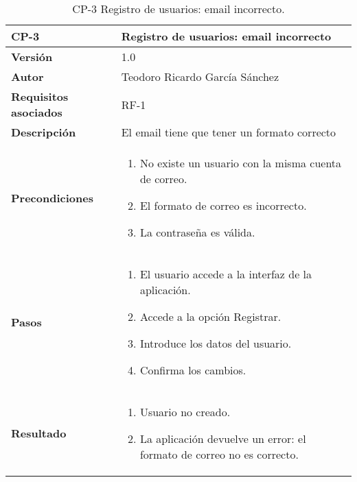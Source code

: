\begin{table}[p]
	\centering
	\begin{tabularx}{\linewidth}{ p{} p{} }
		\toprule
		\textbf{CP-3}    & \textbf{Registro de usuarios: email incorrecto}\\
		\toprule
		\textbf{Versión}              & 1.0    \\
		\textbf{Autor}                & Teodoro Ricardo García Sánchez \\
		\textbf{Requisitos asociados} & RF-1 \\
		\textbf{Descripción}          & El email tiene que tener un formato correcto\\
		\textbf{Precondiciones}       &  
		\begin{enumerate}
			\def\labelenumi{\arabic{enumi}.}
			\tightlist
			\item No existe un usuario con la misma cuenta de correo.
			\item El formato de correo es incorrecto.
			\item La contraseña es válida.
		\end{enumerate}\\
		\textbf{Pasos}             &
		\begin{enumerate}
			\def\labelenumi{\arabic{enumi}.}
			\tightlist
			\item El usuario accede a la interfaz de la aplicación.
			\item Accede a la opción Registrar.
			\item Introduce los datos del usuario.
			\item Confirma los cambios.
		\end{enumerate}\\
		\textbf{Resultado}          & 
		\begin{enumerate}
			\item Usuario no creado.
			\item La aplicación devuelve un error: el formato de correo no es correcto.
		\end{enumerate}\\
		\bottomrule
	\end{tabularx}
	\caption{CP-3 Registro de usuarios: email incorrecto.}
\end{table}

